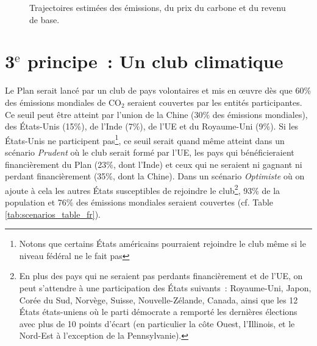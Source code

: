 \documentclass[a5paper,french]{memoir}
\begin{document}
\begin{figure}[h!]
  \caption{Trajectoires estimées des émissions, du prix du carbone et du revenu de base.}\label{fig:trajectory}
\end{figure}

\section{3$^\text{e}$ principe~: Un club climatique}

Le Plan serait lancé par un club de pays volontaires et mis en œuvre dès que 60\% des émissions mondiales de CO$_\text{2}$ seraient couvertes par les entités participantes. Ce seuil peut être atteint par l'union de la Chine (30\% des émissions mondiales), des États-Unis (15\%), de l'Inde (7\%), de l'UE et du Royaume-Uni (9\%). Si les États-Unis ne participent pas\footnote{Notons que certains États américains pourraient rejoindre le club même si le niveau fédéral ne le fait pas}, ce seuil serait quand même atteint dans un scénario \textit{Prudent} où le club serait formé par l'UE, les pays qui bénéficieraient financièrement du Plan (23\%, dont l'Inde) et ceux qui ne seraient ni gagnant ni perdant financièrement (35\%, dont la Chine). Dans un scénario \textit{Optimiste} où on ajoute à cela les autres États susceptibles de rejoindre le club\footnote{En plus des pays qui ne seraient pas perdants financièrement et de l'UE, on peut s'attendre à une participation des États suivants~: Royaume-Uni, Japon, Corée du Sud, Norvège, Suisse, Nouvelle-Zélande, Canada, ainsi que les 12 États états-uniens où le parti démocrate a remporté les dernières élections avec plus de 10 points d'écart (en particulier la côte Ouest, l'Illinois, et le Nord-Est à l'exception de la Pennsylvanie).}, 93\% de la population et 76\% des émissions mondiales seraient couvertes (cf. Table \ref{tab:scenarios_table_fr}). 
\end{document}
